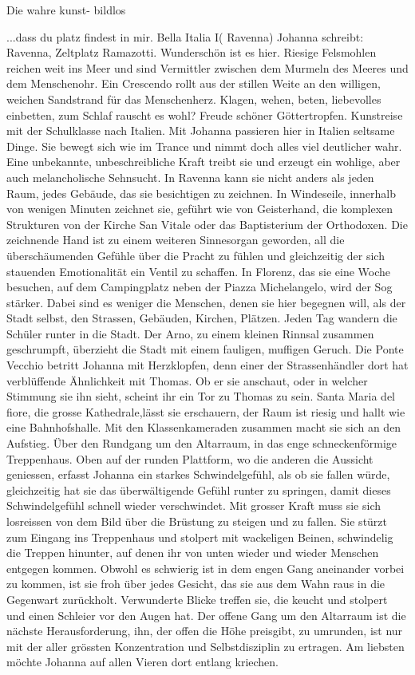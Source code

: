 Die wahre kunst-
bildlos

...dass du
platz findest
	in mir.
 Bella Italia I( Ravenna)
Johanna schreibt:
Ravenna, Zeltplatz Ramazotti.
Wunderschön ist es hier. Riesige Felsmohlen reichen weit ins Meer und sind Vermittler zwischen dem Murmeln des Meeres und dem Menschenohr. Ein Crescendo rollt aus der stillen Weite an den willigen, weichen Sandstrand für das Menschenherz. Klagen, wehen, beten, liebevolles einbetten, zum Schlaf rauscht es wohl? Freude schöner Göttertropfen.
Kunstreise mit der Schulklasse nach Italien.
Mit Johanna passieren hier in Italien seltsame Dinge. Sie bewegt sich wie im Trance und nimmt doch alles viel deutlicher wahr. Eine unbekannte, unbeschreibliche Kraft treibt sie und erzeugt ein wohlige, aber auch melancholische Sehnsucht.
In Ravenna kann sie nicht anders als jeden Raum, jedes Gebäude, das sie besichtigen zu zeichnen. In Windeseile, innerhalb von wenigen Minuten zeichnet sie, geführt wie von Geisterhand, die komplexen Strukturen von der Kirche San Vitale oder das Baptisterium der Orthodoxen. Die zeichnende Hand ist zu einem weiteren Sinnesorgan geworden, all die überschäumenden Gefühle über die Pracht zu fühlen und gleichzeitig der sich stauenden Emotionalität  ein Ventil zu schaffen.
In Florenz, das sie eine Woche besuchen, auf dem Campingplatz neben der Piazza Michelangelo, wird der Sog stärker. Dabei sind es weniger die Menschen, denen sie hier begegnen will, als der Stadt selbst, den Strassen, Gebäuden, Kirchen, Plätzen.
Jeden Tag wandern die Schüler runter in die Stadt. Der Arno, zu einem kleinen Rinnsal zusammen geschrumpft,  überzieht die Stadt mit einem fauligen, muffigen Geruch. Die Ponte Vecchio betritt Johanna mit Herzklopfen, denn einer der Strassenhändler dort hat verblüffende Ähnlichkeit mit Thomas. Ob er sie anschaut, oder in welcher Stimmung sie ihn sieht, scheint ihr ein Tor zu Thomas zu sein.
Santa Maria del fiore, die grosse Kathedrale,lässt sie erschauern, der Raum ist riesig und hallt wie eine Bahnhofshalle. Mit den Klassenkameraden zusammen macht sie sich an den Aufstieg. Über den Rundgang um den Altarraum, in das enge schneckenförmige Treppenhaus. 
Oben auf der runden Plattform, wo die anderen die Aussicht geniessen, erfasst Johanna ein starkes Schwindelgefühl, als ob sie fallen würde, gleichzeitig hat sie das überwältigende Gefühl runter zu springen, damit dieses Schwindelgefühl schnell wieder verschwindet. Mit grosser Kraft muss sie sich losreissen von dem Bild über die Brüstung zu steigen und zu fallen. 
Sie stürzt zum Eingang ins Treppenhaus und stolpert mit wackeligen Beinen, schwindelig die Treppen hinunter, auf denen ihr von unten wieder und wieder Menschen entgegen kommen. Obwohl es schwierig ist in dem engen Gang aneinander vorbei zu kommen, ist sie froh über jedes Gesicht, das sie aus dem Wahn raus in die Gegenwart zurückholt. Verwunderte Blicke treffen sie, die keucht und stolpert und einen Schleier vor den Augen hat. Der offene Gang um den Altarraum ist die nächste Herausforderung, ihn, der offen die Höhe preisgibt, zu umrunden, ist nur mit der aller grössten Konzentration und Selbstdisziplin zu ertragen. Am liebsten möchte Johanna auf allen Vieren  dort entlang kriechen.
